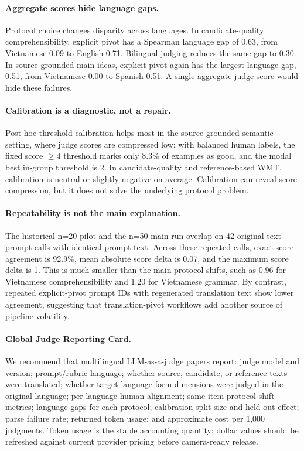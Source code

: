 \documentclass{article}
\begin{document}
\paragraph{Aggregate scores hide language gaps.}
Protocol choice changes disparity across languages. In candidate-quality comprehensibility, explicit pivot has a Spearman language gap of 0.63, from Vietnamese 0.09 to English 0.71. Bilingual judging reduces the same gap to 0.30. In source-grounded main ideas, explicit pivot again has the largest language gap, 0.51, from Vietnamese 0.00 to Spanish 0.51. A single aggregate judge score would hide these failures.

\paragraph{Calibration is a diagnostic, not a repair.}
Post-hoc threshold calibration helps most in the source-grounded semantic setting, where judge scores are compressed low: with balanced human labels, the fixed score $\geq 4$ threshold marks only 8.3\% of examples as good, and the modal best in-group threshold is 2. In candidate-quality and reference-based WMT, calibration is neutral or slightly negative on average. Calibration can reveal score compression, but it does not solve the underlying protocol problem.

\paragraph{Repeatability is not the main explanation.}
The historical n=20 pilot and the n=50 main run overlap on 42 original-text prompt calls with identical prompt text. Across these repeated calls, exact score agreement is 92.9\%, mean absolute score delta is 0.07, and the maximum score delta is 1. This is much smaller than the main protocol shifts, such as 0.96 for Vietnamese comprehensibility and 1.20 for Vietnamese grammar. By contrast, repeated explicit-pivot prompt IDs with regenerated translation text show lower agreement, suggesting that translation-pivot workflows add another source of pipeline volatility.

\paragraph{Global Judge Reporting Card.}
We recommend that multilingual LLM-as-a-judge papers report: judge model and version; prompt/rubric language; whether source, candidate, or reference texts were translated; whether target-language form dimensions were judged in the original language; per-language human alignment; same-item protocol-shift metrics; language gaps for each protocol; calibration split size and held-out effect; parse failure rate; returned token usage; and approximate cost per 1,000 judgments. Token usage is the stable accounting quantity; dollar values should be refreshed against current provider pricing before camera-ready release.
\end{document}
